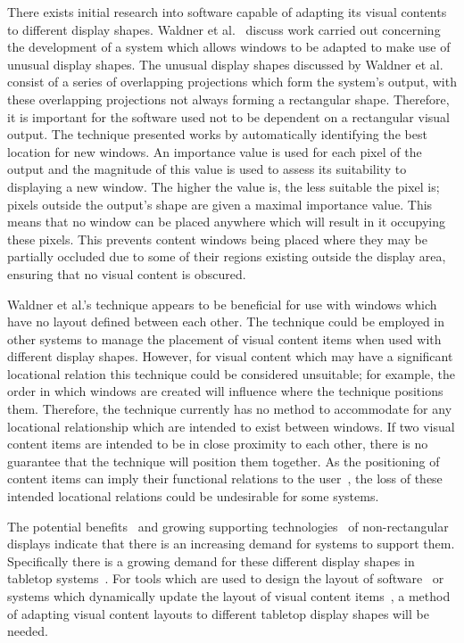 \documentclass[review,5p,times,twocolumn]{elsarticle}
\begin{document}
There exists initial research into software capable of adapting its visual contents to different display shapes.
Waldner et al.~\cite{Waldner2011} discuss work carried out concerning the development of a system which allows windows to be adapted to make use of unusual display shapes.
The unusual display shapes discussed by Waldner et al. consist of a series of overlapping projections which form the system's output, with these overlapping projections not always forming a rectangular shape.
Therefore, it is important for the software used not to be dependent on a rectangular visual output.
The technique presented works by automatically identifying the best location for new windows.
An importance value is used for each pixel of the output and the magnitude of this value is used to assess its suitability to displaying a new window.
The higher the value is, the less suitable the pixel is; pixels outside the output's shape are given a maximal importance value.
This means that no window can be placed anywhere which will result in it occupying these pixels.
This prevents content windows being placed where they may be partially occluded due to some of their regions existing outside the display area, ensuring that no visual content is obscured.

Waldner et al.'s technique appears to be beneficial for use with windows which have no layout defined between each other.
The technique could be employed in other systems to manage the placement of visual content items when used with different display shapes.
However, for visual content which may have a significant locational relation this technique could be considered unsuitable; for example, the order in which windows are created will influence where the technique positions them.
Therefore, the technique currently has no method to accommodate for any locational relationship which are intended to exist between windows.
If two visual content items are intended to be in close proximity to each other, there is no guarantee that the technique will position them together.
As the positioning of content items can imply their functional relations to the user~\cite{Constantine1999}, the loss of these intended locational relations could be undesirable for some systems.

The potential benefits~\cite{Greenfield2006,Vernier2002} and growing supporting technologies~\cite{Boyd2007,Finney2009} of non-rectangular displays indicate that there is an increasing demand for systems to support them.
Specifically there is a growing demand for these different display shapes in tabletop systems~\cite{Hansen2009,Shen2004}.
For tools which are used to design the layout of software~\cite{Meskens2008} or systems which dynamically update the layout of visual content items~\cite{Gajos2004}, a method of adapting visual content layouts to different tabletop display shapes will be needed.
\end{document}
